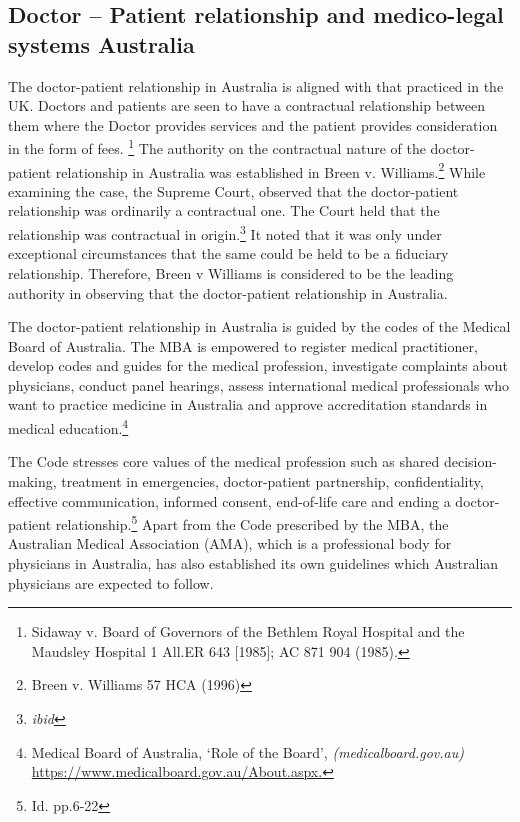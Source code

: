 \begin{multicols}{2}
\vspace{-.3cm}

\subsection*{Doctor – Patient relationship and medico-legal systems Australia}

\vspace{-.2cm}

\noi
The doctor-patient relationship in Australia is aligned with that practiced in the UK. Doctors and patients are seen to have a contractual relationship between them where the Doctor provides services and the patient provides consideration in the form of fees. \footnote{Sidaway v. Board of Governors of the Bethlem Royal Hospital and the Maudsley Hospital 1 All.ER
643 [1985]; AC 871 904 (1985).} The authority on the contractual nature of the doctor-patient relationship in Australia was established in Breen v. Williams.\footnote{Breen v. Williams 57 HCA (1996)} While examining the case, the Supreme Court, observed that the doctor-patient relationship was ordinarily a contractual one. The Court held that the relationship was contractual in origin.\footnote{\textit{ibid}} It noted that it was only under exceptional circumstances that the same could be held to be a fiduciary relationship. Therefore, Breen v Williams is considered to be the leading authority in observing that the doctor-patient relationship in Australia.

\noi
The doctor-patient relationship in Australia is guided by the codes of the Medical Board  of Australia. The MBA is empowered to register medical practitioner, develop codes and guides for the medical profession, investigate complaints about physicians, conduct panel hearings, assess international medical professionals who want to practice medicine in Australia and approve accreditation standards in medical education.\footnote{Medical Board of Australia, ‘Role of the Board’, \textit{(medicalboard.gov.au)} \url{https://www.medicalboard.gov.au/About.aspx.}}

\noi
The Code stresses core values of the medical profession such as shared decision-making,
treatment in emergencies, doctor-patient partnership, confidentiality, effective
communication, informed consent, end-of-life care and ending a doctor-patient
relationship.\footnote{Id. pp.6-22} Apart from the Code prescribed by the MBA, the Australian Medical
Association (AMA), which is a professional body for physicians in Australia, has also
established its own guidelines which Australian physicians are expected to follow.


\end{multicols}
